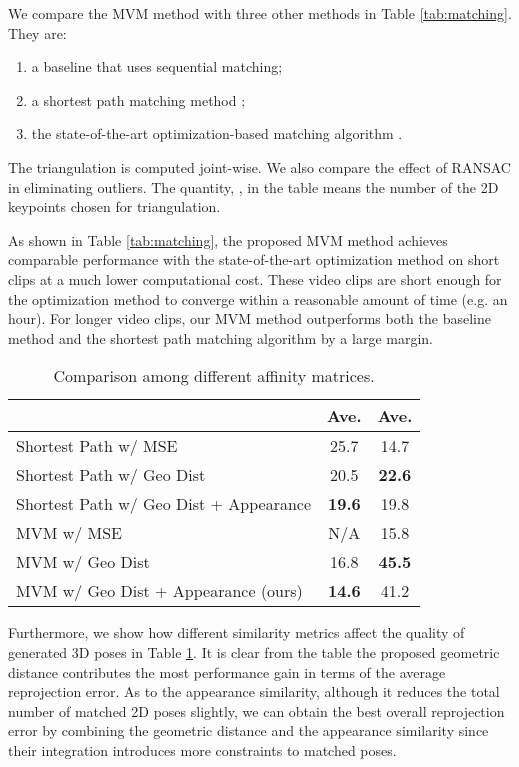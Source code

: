 \documentclass{article}
\begin{document}
We compare the MVM method with three other methods in Table
\ref{tab:matching}. They are:
\begin{enumerate} 
\item a baseline that uses sequential matching;
\item a shortest path matching method \cite{arnab2019exploiting};
\item the state-of-the-art optimization-based matching algorithm \cite{dong2019fast}.  
\end{enumerate} 
The triangulation is computed joint-wise.  We also compare the effect of
RANSAC in eliminating outliers. The quantity, , in the table
means the number of the 2D keypoints chosen for triangulation. 

As shown in Table \ref{tab:matching}, the proposed MVM method achieves
comparable performance with the state-of-the-art optimization method
\cite{dong2019fast} on short clips at a much lower computational cost.
These video clips are short enough for the optimization method to
converge within a reasonable amount of time (e.g. an hour). For longer
video clips, our MVM method outperforms both the baseline method and
the shortest path matching algorithm by a large margin. 

\begin{table}[htb]
\centering
\begin{tabular}{l|cc} \hline \hline
& Ave.  & Ave.  \\ \hline \hline
Shortest Path w/ MSE & 25.7 & 14.7 \\
Shortest Path w/ Geo Dist & 20.5 & \textbf{22.6} \\
Shortest Path w/ Geo Dist + Appearance & \textbf{19.6} & 19.8 \\ \hline
MVM w/ MSE & N/A & 15.8 \\
MVM w/ Geo Dist & 16.8 & \textbf{45.5} \\
MVM w/ Geo Dist + Appearance (ours) & \textbf{14.6} & 41.2 \\ \hline \hline
\end{tabular}
\caption{Comparison among different affinity matrices.}
\label{tab:sim}
\end{table}


Furthermore, we show how different similarity metrics affect the quality
of generated 3D poses in Table \ref{tab:sim}. It is clear from the table
the proposed geometric distance contributes the most performance gain in
terms of the average reprojection error. As to the appearance
similarity, although it reduces the total number of matched 2D poses
slightly, we can obtain the best overall reprojection error by combining
the geometric distance and the appearance similarity since their
integration introduces more constraints to matched poses. 
\end{document}
